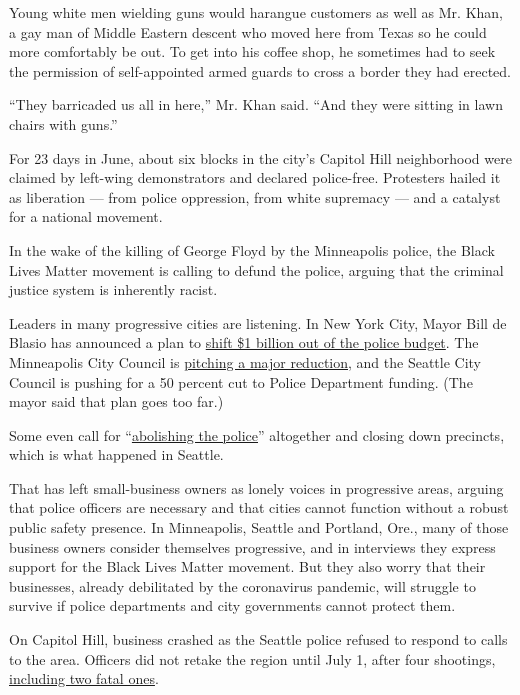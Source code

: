 Young white men wielding guns would harangue customers as well as Mr.
Khan, a gay man of Middle Eastern descent who moved here from Texas so
he could more comfortably be out. To get into his coffee shop, he
sometimes had to seek the permission of self-appointed armed guards to
cross a border they had erected.

``They barricaded us all in here,'' Mr. Khan said. ``And they were
sitting in lawn chairs with guns.''

For 23 days in June, about six blocks in the city's Capitol Hill
neighborhood were claimed by left-wing demonstrators and declared
police-free. Protesters hailed it as liberation --- from police
oppression, from white supremacy --- and a catalyst for a national
movement.

In the wake of the killing of George Floyd by the Minneapolis police,
the Black Lives Matter movement is calling to defund the police, arguing
that the criminal justice system is inherently racist.

Leaders in many progressive cities are listening. In New York City,
Mayor Bill de Blasio has announced a plan to
\href{https://www.nytimes3xbfgragh.onion/2020/06/30/nyregion/nypd-budget.html}{shift
\$1 billion out of the police budget}. The Minneapolis City Council is
\href{https://www.nytimes3xbfgragh.onion/2020/06/07/us/minneapolis-police-abolish.html}{pitching
a major reduction}, and the Seattle City Council is pushing for a 50
percent cut to Police Department funding. (The mayor said that plan goes
too far.)

Some even call for
``\href{https://www.nytimes3xbfgragh.onion/2020/06/12/opinion/sunday/floyd-abolish-defund-police.html}{abolishing
the police}'' altogether and closing down precincts, which is what
happened in Seattle.

That has left small-business owners as lonely voices in progressive
areas, arguing that police officers are necessary and that cities cannot
function without a robust public safety presence. In Minneapolis,
Seattle and Portland, Ore., many of those business owners consider
themselves progressive, and in interviews they express support for the
Black Lives Matter movement. But they also worry that their businesses,
already debilitated by the coronavirus pandemic, will struggle to
survive if police departments and city governments cannot protect them.

On Capitol Hill, business crashed as the Seattle police refused to
respond to calls to the area. Officers did not retake the region until
July 1, after four shootings,
\href{https://www.nytimes3xbfgragh.onion/2020/06/22/us/seattle-autonomous-zone-chop-shootings.html}{including
two fatal ones}.

